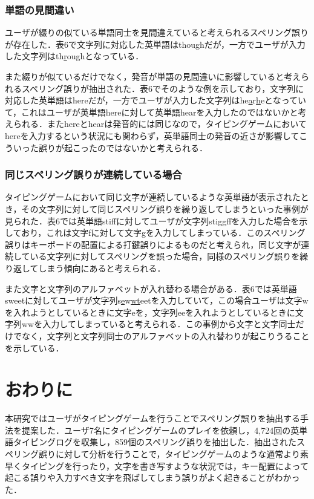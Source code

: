 \documentclass{jarticle}
\begin{document}
\subsubsection{単語の見間違い}
ユーザが綴りの似ている単語同士を見間違えていると考えられるスペリング誤りが存在した．表6で文字列に対応した英単語はthoughだが，一方でユーザが入力した文字列はth\underline{r}oughとなっている．

また綴りが似ているだけでなく，発音が単語の見間違いに影響していると考えられるスペリング誤りが抽出された．表6でそのような例を示しており，文字列に対応した英単語はhereだが，一方でユーザが入力した文字列はhe\underline{a}r\underline{h}eとなっていて，これはユーザが英単語hereに対して英単語hearを入力したのではないかと考えられる．またhereとhearは発音的には同じなので，タイピングゲームにおいてhereを入力するという状況にも関わらず，英単語同士の発音の近さが影響してこういった誤りが起こったのではないかと考えられる．

\subsubsection{同じスペリング誤りが連続している場合}
タイピングゲームにおいて同じ文字が連続しているような英単語が表示されたとき，その文字列に対して同じスペリング誤りを繰り返してしまうといった事例が見られた．表6では英単語stiffに対してユーザが文字列sti\underline{gg}ffを入力した場合を示しており，これは文字fに対して文字gを入力してしまっている．このスペリング誤りはキーボードの配置による打鍵誤りによるものだと考えられ，同じ文字が連続している文字列に対してスペリングを誤った場合，同様のスペリング誤りを繰り返してしまう傾向にあると考えられる．

また文字と文字列のアルファベットが入れ替わる場合がある．表6では英単語sweetに対してユーザが文字列s\underline{e}w\underline{wt}eetを入力していて，この場合ユーザは文字wを入れようとしているときに文字eを，文字列eeを入れようとしているときに文字列wwを入力してしまっていると考えられる．この事例から文字と文字同士だけでなく，文字列と文字列同士のアルファベットの入れ替わりが起こりうることを示している．

\section{おわりに}
本研究ではユーザがタイピングゲームを行うことでスペリング誤りを抽出する手法を提案した．ユーザ7名にタイピングゲームのプレイを依頼し，4,724回の英単語タイピングログを収集し，859個のスペリング誤りを抽出した．抽出されたスペリング誤りに対して分析を行うことで，タイピングゲームのような通常より素早くタイピングを行ったり，文字を書き写すような状況では，キー配置によって起こる誤りや入力すべき文字を飛ばしてしまう誤りがよく起きることがわかった．
\end{document}
